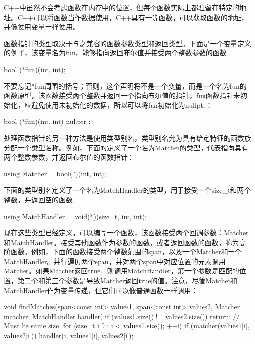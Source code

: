 
C++中虽然不会考虑函数在内存中的位置，但每个函数实际上都驻留在特定的地址。C++可以将函数当作数据使用，C++具有一等函数，可以获取函数的地址，并像使用变量一样使用。

函数指针的类型取决于与之兼容的函数参数类型和返回类型。下面是一个变量定义的例子，该变量名为fun，能够指向返回布尔值并接受两个整数参数的函数：

\begin{cpp}
bool (*fun)(int, int);
\end{cpp}

不要忘记*fun周围的括号；否则，这个声明将不是一个变量，而是一个名为fun的函数原型，该函数接受两个整数并返回一个指向布尔值的指针。fun函数指针未初始化，应避免使用未初始化的数据，所以可以将fun初始化为nullptr：

\begin{cpp}
bool (*fun)(int, int) { nullptr };
\end{cpp}


处理函数指针的另一种方法是使用类型别名，类型别名允为具有给定特征的函数族分配一个类型名称。例如，下面的定义了一个名为Matcher的类型，代表指向具有两个整数参数，并返回布尔值的函数指针：

\begin{cpp}
using Matcher = bool(*)(int, int);
\end{cpp}

下面的类型别名定义了一个名为MatchHandler的类型，用于接受一个size\_t和两个整数，并返回空的函数：

\begin{cpp}
using MatchHandler = void(*)(size_t, int, int);
\end{cpp}

现在这些类型已经定义，可以编写一个函数，该函数接受两个回调参数：Matcher和MatchHandler。接受其他函数作为参数的函数，或者返回函数的函数，称为高阶函数。例如，下面的函数接受两个整数范围的span，以及一个Matcher和一个MatchHandler。并行遍历两个span，并对两个span中对应位置的元素调用Matcher。如果Matcher返回true，则调用MatchHandler，第一个参数是匹配的位置，第二个和第三个参数是导致Matcher返回true的值。注意，尽管Matcher和MatchHandler作为变量传递，但它们可以像普通函数一样调用：

\begin{cpp}
void findMatches(span<const int> values1, span<const int> values2,
Matcher matcher, MatchHandler handler)
{
    if (values1.size() != values2.size()) { return; } // Must be same size.
    for (size_t i { 0 }; i < values1.size(); ++i) {
        if (matcher(values1[i], values2[i])) {
            handler(i, values1[i], values2[i]);
        }
    }
}
\end{cpp}

